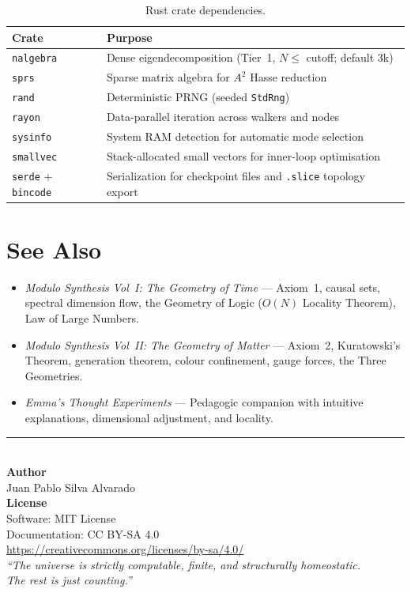 \documentclass[11pt, a4paper, openany]{book}
\newcommand{\code}[1]{\texttt{#1}}
\begin{document}
\begin{table}[H]
\centering
\begin{tabular}{@{} l l @{}}
\toprule
\textbf{Crate} & \textbf{Purpose} \\
\midrule
\code{nalgebra} & Dense eigendecomposition (Tier~1, $N \le$ cutoff; default 3k) \\
\code{sprs}     & Sparse matrix algebra for $A^2$ Hasse reduction \\
\code{rand}     & Deterministic PRNG (seeded \code{StdRng}) \\
\code{rayon}    & Data-parallel iteration across walkers and nodes \\
\code{sysinfo}  & System RAM detection for automatic mode selection \\
\code{smallvec} & Stack-allocated small vectors for inner-loop optimisation \\
\code{serde} + \code{bincode} & Serialization for checkpoint files and \code{.slice} topology export \\
\bottomrule
\end{tabular}
\caption{Rust crate dependencies.}
\end{table}


\chapter*{See Also}

\begin{itemize}
  \item \emph{Modulo Synthesis Vol~I: The Geometry of Time} --- Axiom~1, causal
        sets, spectral dimension flow, the Geometry of Logic ($O(N)$ Locality
        Theorem), Law of Large Numbers.
  \item \emph{Modulo Synthesis Vol~II: The Geometry of Matter} --- Axiom~2,
        Kuratowski's Theorem, generation theorem, colour confinement, gauge
        forces, the Three Geometries.
  \item \emph{Emma's Thought Experiments} --- Pedagogic companion with
        intuitive explanations, dimensional adjustment, and locality.
\end{itemize}

\vfill
\begin{center}
{\color{main}\rule{0.6\textwidth}{1pt}}\\[1em]
{\large\bfseries\color{structure} Author}\\[4pt]
Juan Pablo Silva Alvarado\\[1em]
{\large\bfseries\color{structure} License}\\[4pt]
Software: MIT License\\
Documentation: CC BY-SA 4.0\\
\url{https://creativecommons.org/licenses/by-sa/4.0/}\\[1em]
\itshape\color{gray!60}
``The universe is strictly computable, finite, and structurally homeostatic.\\
The rest is just counting.''
\end{center}
\end{document}
